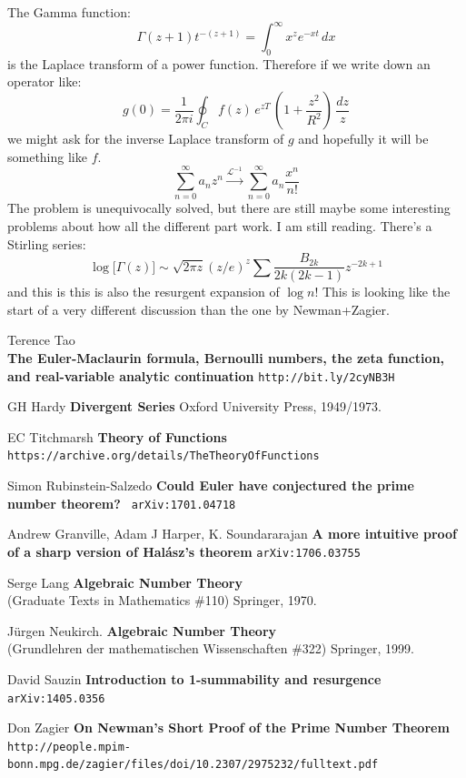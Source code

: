 \documentclass[12pt]{article}
\begin{document}
\newpage

\noindent The Gamma function: 
$$ \Gamma(z+1) t^{-(z+1)} = \int_0^\infty x^z e^{-xt} \, dx $$
is the Laplace transform of a power function.  Therefore if we write down an operator like:
$$ g(0) = \frac{1}{2\pi i } \oint_{C} f(z) \, e^{zT} \, \left( 1 + \frac{z^2}{R^2} \right) \, \frac{dz}{z} $$
we might ask for the inverse Laplace transform of $g$ and hopefully it will be something like $f$.
$$ \sum_{n=0}^\infty a_n z^n \stackrel{\mathcal{L}^{-1}}{\to} \sum_{n=0}^\infty a_n \frac{x^n}{n!}$$ 
The problem is unequivocally solved, but there are still maybe some interesting problems about how all the different part work.  I am still reading.  There's a Stirling series:
$$ \log \big[ \Gamma(z)  \big]
\sim \sqrt{2\pi z} (z/e)^z  
\sum \frac{B_{2k}}{2k(2k-1)} z^{-2k+1}  $$
and this is this is also the resurgent expansion of $\log n!$ This is looking like the start of a  very different discussion than the one by Newman+Zagier.

\begin{thebibliography}{}

\item Terence Tao 
\\ \textbf{The Euler-Maclaurin formula, Bernoulli numbers, the zeta function, and real-variable analytic continuation} 
\texttt{http://bit.ly/2cyNB3H}
\item GH Hardy \textbf{Divergent Series}  Oxford University Press, 1949/1973.
\item EC Titchmarsh \textbf{Theory of Functions} \texttt{https://archive.org/details/TheTheoryOfFunctions}
\item Simon Rubinstein-Salzedo \textbf{Could Euler have conjectured the prime number theorem?} \texttt{ arXiv:1701.04718}
\item Andrew Granville, Adam J Harper, K. Soundararajan \textbf{A more intuitive proof of a sharp version of Hal\'{a}sz's theorem} \texttt{arXiv:1706.03755}

\item Serge Lang \textbf{Algebraic Number Theory} \\
(Graduate Texts in Mathematics \#110) Springer, 1970.

\item J\"{u}rgen Neukirch. \textbf{Algebraic Number Theory} \\ (Grundlehren der mathematischen Wissenschaften \#322) Springer, 1999.

\item David Sauzin \textbf{Introduction to 1-summability and resurgence} \texttt{arXiv:1405.0356}

\item Don Zagier \textbf{On Newman's Short Proof of the Prime Number Theorem} \texttt{http://people.mpim-bonn.mpg.de/zagier/files/doi/10.2307/2975232/fulltext.pdf}

\end{thebibliography}
\end{document}
